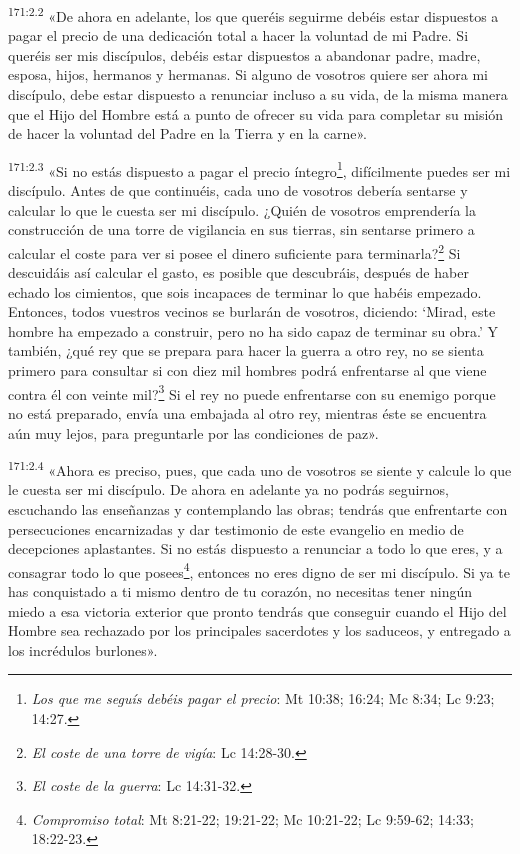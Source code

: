 \par
\textsuperscript{171:2.2} «De ahora en adelante, los que queréis seguirme debéis estar dispuestos a pagar el precio de una dedicación total a hacer la voluntad de mi Padre. Si queréis ser mis discípulos, debéis estar dispuestos a abandonar padre, madre, esposa, hijos, hermanos y hermanas. Si alguno de vosotros quiere ser ahora mi discípulo, debe estar dispuesto a renunciar incluso a su vida, de la misma manera que el Hijo del Hombre está a punto de ofrecer su vida para completar su misión de hacer la voluntad del Padre en la Tierra y en la carne».

\par
\textsuperscript{171:2.3} «Si no estás dispuesto a pagar el precio íntegro\footnote{\textit{Los que me seguís debéis pagar el precio}: Mt 10:38; 16:24; Mc 8:34; Lc 9:23; 14:27.}, difícilmente puedes ser mi discípulo. Antes de que continuéis, cada uno de vosotros debería sentarse y calcular lo que le cuesta ser mi discípulo. ¿Quién de vosotros emprendería la construcción de una torre de vigilancia en sus tierras, sin sentarse primero a calcular el coste para ver si posee el dinero suficiente para terminarla?\footnote{\textit{El coste de una torre de vigía}: Lc 14:28-30.} Si descuidáis así calcular el gasto, es posible que descubráis, después de haber echado los cimientos, que sois incapaces de terminar lo que habéis empezado. Entonces, todos vuestros vecinos se burlarán de vosotros, diciendo: `Mirad, este hombre ha empezado a construir, pero no ha sido capaz de terminar su obra.' Y también, ¿qué rey que se prepara para hacer la guerra a otro rey, no se sienta primero para consultar si con diez mil hombres podrá enfrentarse al que viene contra él con veinte mil?\footnote{\textit{El coste de la guerra}: Lc 14:31-32.} Si el rey no puede enfrentarse con su enemigo porque no está preparado, envía una embajada al otro rey, mientras éste se encuentra aún muy lejos, para preguntarle por las condiciones de paz».

\par
\textsuperscript{171:2.4} «Ahora es preciso, pues, que cada uno de vosotros se siente y calcule lo que le cuesta ser mi discípulo. De ahora en adelante ya no podrás seguirnos, escuchando las enseñanzas y contemplando las obras; tendrás que enfrentarte con persecuciones encarnizadas y dar testimonio de este evangelio en medio de decepciones aplastantes. Si no estás dispuesto a renunciar a todo lo que eres, y a consagrar todo lo que posees\footnote{\textit{Compromiso total}: Mt 8:21-22; 19:21-22; Mc 10:21-22; Lc 9:59-62; 14:33; 18:22-23.}, entonces no eres digno de ser mi discípulo. Si ya te has conquistado a ti mismo dentro de tu corazón, no necesitas tener ningún miedo a esa victoria exterior que pronto tendrás que conseguir cuando el Hijo del Hombre sea rechazado por los principales sacerdotes y los saduceos, y entregado a los incrédulos burlones».

